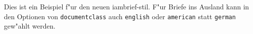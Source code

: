 \documentclass[12pt,german]{iambrief}
\begin{document}
\begin{iambrief}
Dies ist ein Beispiel f"ur den neuen iambrief-stil.
F"ur Briefe ins Ausland kann in den Optionen von \texttt{documentclass}
auch \texttt{english} oder \texttt{american} statt \texttt{german}
gew"ahlt werden. 

\end{iambrief}
\end{document}
